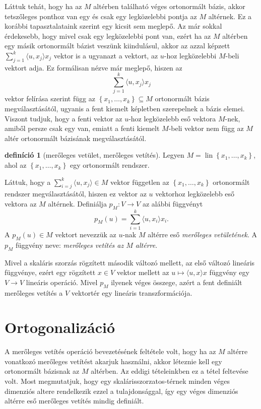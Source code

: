 \documentclass[a4paper, showtrims]{memoir}
\theoremstyle{plain}
\theoremstyle{remark}
\theoremstyle{definition}
\newtheorem{definition}[proposition]{definíció}
\DeclareMathOperator{\lin}{lin}
\newcommand{\ip}[2]{\langle#1,#2\rangle}
\begin{document}
Láttuk tehát, hogy ha az $M$ altérben található véges ortonormált bázis,
akkor tetszőleges ponthoz van egy és csak egy legközelebbi pontja az $M$ altérnek.
Ez a korábbi tapasztalataink szerint egy kicsit sem meglepő.
Az már sokkal érdekesebb, hogy mivel csak egy legközelebbi pont van, ezért
ha az $M$ altérben egy másik ortonormált bázist veszünk kiindulásul, akkor az azzal képzett
$\sum_{j=1}^k\ip{u}{x_j}x_j$ vektor is a ugyanazt a vektort, az $u$-hoz legközelebbi $M$-beli vektort adja.
Ez formálisan nézve már meglepő, hiszen az
\[
	\sum_{j=1}^k\ip{u}{x_j}x_j
\]
vektor felírása szerint függ az $\left\{ x_1,\ldots,x_k \right\}\subseteq M$ ortonormált bázis megválasztásától,
ugyanis a fent kiemelt képletben szerepelnek a bázis elemei.
Viszont tudjuk, hogy a fenti vektor az $u$-hoz legközelebb eső vektora $M$-nek, amiből persze csak egy van,
emiatt a fenti kiemelt $M$-beli vektor nem függ az $M$ altér ortonormált bázisának megválasztásától.
\begin{definition}[merőleges vetület, merőleges vetítés]
	Legyen $M=\lin\left\{ x_1,\ldots,x_k \right\}$,
	ahol az $\left\{ x_1,\ldots,x_k \right\}$ egy ortonormált rendszer.

	Láttuk, hogy a
	$\sum_{i=j}^k\ip{u}{x_j}\in M$ vektor független
	az $\left\{ x_1,\ldots,x_k \right\}$ ortonormált rendszer megválasztásától,
	hiszen ez vektor az $u$ vektorhoz legközelebb eső vektora az $M$ altérnek.
	Definiálja $p_M:V\to V$ az alábbi függvényt
	\[
		p_M\left( u \right)=
		\sum_{i=1}^k\ip{u}{x_i}x_i.
	\]
	A $p_M\left( u \right)\in M$ vektort nevezzük az $u$-nak $M$ altérre eső \emph{merőleges vetületének}.
	A $p_M$ függvény neve: \emph{merőleges vetítés az $M$ altérre}.
\end{definition}
Mivel a skaláris szorzás rögzített második változó mellett,
az első változó lineáris függvénye,
ezért egy rögzített $x\in V$ vektor mellett az $u\mapsto\ip{u}{x}x$ függvény egy $V\to V$ lineáris operáció.
Mivel $p_M$ ilyenek véges összege, azért a fent definiált merőleges vetítés a $V$ vektortér egy lineáris transzformációja.
\section{Ortogonalizáció}
A merőleges vetítés operáció bevezetésének feltétele volt, hogy ha az $M$ altérre vonatkozó
merőleges vetítést akarjuk használni, akkor léteznie kell egy ortonormált bázisnak az $M$ altérben.
Az eddigi tételeinkben ez a tétel feltevése volt.
Most megmutatjuk, hogy egy skalárisszorzatos-térnek minden véges dimenziós altere rendelkezik ezzel a
tulajdonsággal, így egy véges dimenziós altérre eső merőleges vetítés mindig definiált.
\end{document}
